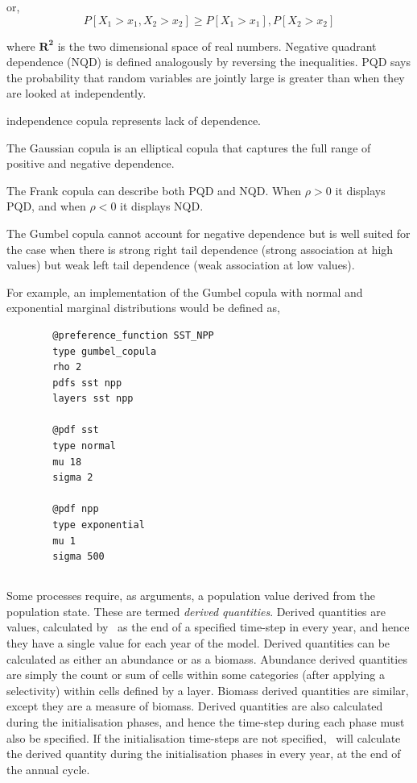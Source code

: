 or,
\begin{equation}
  P[X_1 > x_1, X_2 > x_2] \geq P[X_1 > x_1],P[X_2 > x_2] 
\end{equation}

where $\boldsymbol{R^2}$ is the two dimensional space of real numbers. Negative quadrant dependence (NQD) is defined analogously by reversing the inequalities. PQD says the probability that random variables are jointly large is greater than when they are looked at independently.

independence copula represents lack of dependence. 

The Gaussian copula is an elliptical copula that captures the full range of positive and negative dependence.
 
The Frank copula can describe both PQD and NQD. When $\rho > 0$ it displays PQD, and when $\rho < 0$ it displays NQD. 

The Gumbel copula cannot account for negative dependence but is well suited for the case when there is strong right tail dependence (strong association at high values) but weak left tail dependence (weak association at low values). 

For example, an implementation of the Gumbel copula with normal and exponential marginal distributions would be defined as,

{\small{\begin{verbatim}
		@preference_function SST_NPP
		type gumbel_copula
		rho 2
		pdfs sst npp
		layers sst npp
		
		@pdf sst
		type normal 
		mu 18
		sigma 2
		
		@pdf npp
		type exponential
		mu 1
		sigma 500
\end{verbatim}}}

\subsection{\label{sec:derived-quantities}}

Some processes require, as arguments, a population value derived from the population state. These are termed \emph{derived quantities}. Derived quantities are values, calculated by \SPM\ as the end of a specified time-step in every year, and hence they have a single value for each year of the model. Derived quantities can be calculated as either an abundance or as a biomass. Abundance derived quantities are simply the count or sum of cells within some categories (after applying a selectivity) within cells defined by a layer. Biomass derived quantities are similar, except they are a measure of biomass. Derived quantities are also calculated during the initialisation phases, and hence the time-step during each phase must also be specified. If the initialisation time-steps are not specified, \SPM\ will calculate the derived quantity during the initialisation phases in every year, at the end of the annual cycle.


